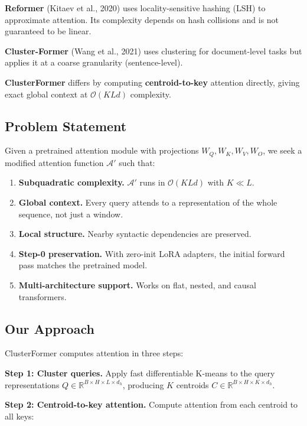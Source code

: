 \textbf{Reformer} (Kitaev et al., 2020) uses locality-sensitive hashing (LSH) 
to approximate attention. Its complexity depends on hash collisions and is 
not guaranteed to be linear.

\textbf{Cluster-Former} (Wang et al., 2021) uses clustering for document-level 
tasks but applies it at a coarse granularity (sentence-level).

\textbf{ClusterFormer} differs by computing \textbf{centroid-to-key} attention 
directly, giving exact global context at $\mathcal{O}(K L d)$ complexity.

\subsection{Problem Statement}

Given a pretrained attention module with projections $W_Q, W_K, W_V, W_O$, 
we seek a modified attention function $\mathcal{A}'$ such that:

\begin{enumerate}
\item \textbf{Subquadratic complexity.} $\mathcal{A}'$ runs in $\mathcal{O}(K L d)$
  with $K \ll L$.
\item \textbf{Global context.} Every query attends to a representation of the whole
  sequence, not just a window.
\item \textbf{Local structure.} Nearby syntactic dependencies are preserved.
\item \textbf{Step-0 preservation.} With zero-init LoRA adapters, the initial forward
  pass matches the pretrained model.
\item \textbf{Multi-architecture support.} Works on flat, nested, and causal
  transformers.

\end{enumerate}
\subsection{Our Approach}

ClusterFormer computes attention in three steps:

\textbf{Step 1: Cluster queries.} Apply fast differentiable K-means to the query 
representations $Q \in \mathbb{R}^{B \times H \times L \times d_h}$, 
producing $K$ centroids $C \in \mathbb{R}^{B \times H \times K \times d_h}$.

\textbf{Step 2: Centroid-to-key attention.} Compute attention from each centroid 
to all keys:

